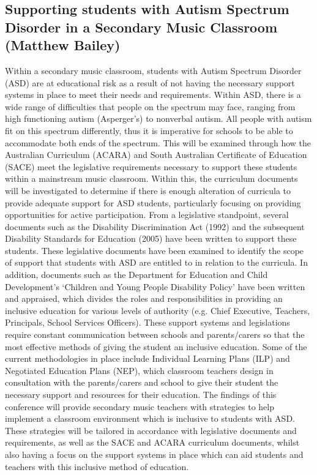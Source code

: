 \documentclass[twoside,14pt,a4paper,notitlepage]{memoir}
\begin{document}
\subsection*{Supporting students with Autism Spectrum Disorder in a Secondary Music Classroom (Matthew Bailey)}
\label{aut:bailey}

Within a secondary music classroom, students with Autism Spectrum Disorder (ASD) are at educational risk as a result of not having the necessary support systems in place to meet their needs and requirements. Within ASD, there is a wide range of difficulties that people on the spectrum may face, ranging from high functioning autism (Asperger’s) to nonverbal autism. All people with autism fit on this spectrum differently, thus it is imperative for schools to be able to accommodate both ends of the spectrum. This will be examined through how the Australian Curriculum (ACARA) and South Australian Certificate of Education (SACE) meet the legislative requirements necessary to support these students within a mainstream music classroom. Within this, the curriculum documents will be investigated to determine if there is enough alteration of curricula to provide adequate support for ASD students, particularly focusing on providing opportunities for active participation.
From a legislative standpoint, several documents such as the Disability Discrimination Act (1992) and the subsequent Disability Standards for Education (2005) have been written to support these students. These legislative documents have been examined to identify the scope of support that students with ASD are entitled to in relation to the curricula. In addition, documents such as the Department for Education and Child Development’s ‘Children and Young People Disability Policy’ have been written and appraised, which divides the roles and responsibilities in providing an inclusive education for various levels of authority (e.g. Chief Executive, Teachers, Principals, School Services Officers).
These support systems and legislations require constant communication between schools and parents/carers so that the most effective methods of giving the student an inclusive education. Some of the current methodologies in place include Individual Learning Plans (ILP) and Negotiated Education Plans (NEP), which classroom teachers design in consultation with the parents/carers and school to give their student the necessary support and resources for their education.
The findings of this conference will provide secondary music teachers with strategies to help implement a classroom environment which is inclusive to students with ASD. These strategies will be tailored in accordance with legislative documents and requirements, as well as the SACE and ACARA curriculum documents, whilst also having a focus on the support systems in place which can aid students and teachers with this inclusive method of education.
\end{document}
